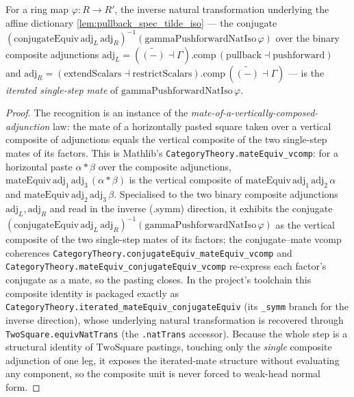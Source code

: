 \begin{lemma}
  \label{lem:ring_square_glue_pst_iterated_mate}
  For a ring map \(\varphi : R \to R'\), the inverse natural transformation underlying the affine
  dictionary \cref{lem:pullback_spec_tilde_iso} --- the conjugate
  \((\mathrm{conjugateEquiv}\,\mathrm{adj}_L\,\mathrm{adj}_R)^{-1}(\mathrm{gammaPushforwardNatIso}\,\varphi)\)
  over the binary composite adjunctions
  \(\mathrm{adj}_L = (\widetilde{(-)}\dashv\Gamma).\mathrm{comp}\,(\mathrm{pullback}\dashv\mathrm{pushforward})\)
  and
  \(\mathrm{adj}_R = (\mathrm{extendScalars}\dashv\mathrm{restrictScalars}).\mathrm{comp}\,(\widetilde{(-)}\dashv\Gamma)\)
  --- is the \emph{iterated single-step mate} of \(\mathrm{gammaPushforwardNatIso}\,\varphi\).
  \begin{proof}
    The recognition is an instance of the \emph{mate-of-a-vertically-composed-adjunction} law: the mate
    of a horizontally pasted square taken over a vertical composite of adjunctions equals the vertical
    composite of the two single-step mates of its factors. This is Mathlib's
    \texttt{CategoryTheory.mateEquiv\_vcomp}: for a horizontal paste \(\alpha \ast \beta\) over the
    composite adjunctions, \(\mathrm{mateEquiv}\,\mathrm{adj}_1\,\mathrm{adj}_3\,(\alpha \ast \beta)\)
    is the vertical composite of \(\mathrm{mateEquiv}\,\mathrm{adj}_1\,\mathrm{adj}_2\,\alpha\) and
    \(\mathrm{mateEquiv}\,\mathrm{adj}_2\,\mathrm{adj}_3\,\beta\). Specialised to the two binary
    composite adjunctions \(\mathrm{adj}_L,\mathrm{adj}_R\) and read in the inverse (\(\mathrm{.symm}\))
    direction, it exhibits the conjugate
    \((\mathrm{conjugateEquiv}\,\mathrm{adj}_L\,\mathrm{adj}_R)^{-1}(\mathrm{gammaPushforwardNatIso}\,\varphi)\)
    as the vertical composite of the two single-step mates of its factors; the conjugate--mate vcomp
    coherences \texttt{CategoryTheory.conjugateEquiv\_mateEquiv\_vcomp} and
    \texttt{CategoryTheory.mateEquiv\_conjugateEquiv\_vcomp} re-express each factor's conjugate as a
    mate, so the pasting closes. In the project's toolchain this composite identity is packaged exactly
    as \texttt{CategoryTheory.iterated\_mateEquiv\_conjugateEquiv} (its \texttt{\_symm} branch for the
    inverse direction), whose underlying natural transformation is recovered through
    \texttt{TwoSquare.equivNatTrans} (the \texttt{.natTrans} accessor). Because the whole step is a
    structural identity of \(\mathrm{TwoSquare}\) pastings, touching only the \emph{single} composite
    adjunction of one leg, it exposes the iterated-mate structure without evaluating any component, so
    the composite unit is never forced to weak-head normal form.
  \end{proof}
\end{lemma}

